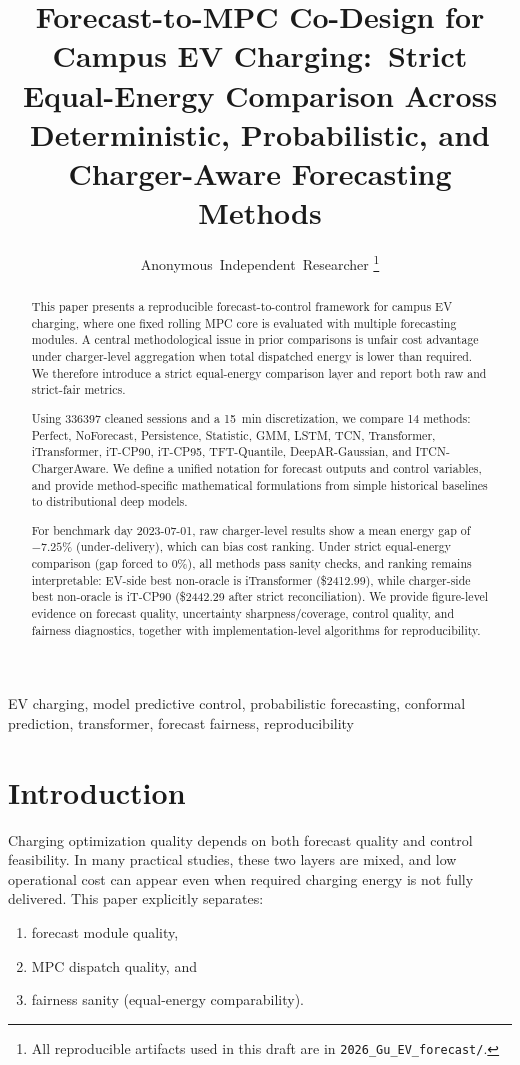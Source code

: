\documentclass[journal]{IEEEtran}
\title{Forecast-to-MPC Co-Design for Campus EV Charging:\
Strict Equal-Energy Comparison Across Deterministic, Probabilistic, and Charger-Aware Forecasting Methods}
\author{Anonymous~Independent~Researcher
\thanks{All reproducible artifacts used in this draft are in \texttt{2026\_Gu\_EV\_forecast/}.}}
\begin{document}
\maketitle

\begin{abstract}
This paper presents a reproducible forecast-to-control framework for campus EV charging, where one fixed rolling MPC core is evaluated with multiple forecasting modules. A central methodological issue in prior comparisons is unfair cost advantage under charger-level aggregation when total dispatched energy is lower than required. We therefore introduce a strict equal-energy comparison layer and report both raw and strict-fair metrics.

Using \num{336397} cleaned sessions and a \SI{15}{min} discretization, we compare 14 methods: Perfect, NoForecast, Persistence, Statistic, GMM, LSTM, TCN, Transformer, iTransformer, iT-CP90, iT-CP95, TFT-Quantile, DeepAR-Gaussian, and ITCN-ChargerAware. We define a unified notation for forecast outputs and control variables, and provide method-specific mathematical formulations from simple historical baselines to distributional deep models.

For benchmark day 2023-07-01, raw charger-level results show a mean energy gap of $-7.25\%$ (under-delivery), which can bias cost ranking. Under strict equal-energy comparison (gap forced to $0\%$), all methods pass sanity checks, and ranking remains interpretable: EV-side best non-oracle is iTransformer (\$2412.99), while charger-side best non-oracle is iT-CP90 (\$2442.29 after strict reconciliation). We provide figure-level evidence on forecast quality, uncertainty sharpness/coverage, control quality, and fairness diagnostics, together with implementation-level algorithms for reproducibility.
\end{abstract}

\begin{IEEEkeywords}
EV charging, model predictive control, probabilistic forecasting, conformal prediction, transformer, forecast fairness, reproducibility
\end{IEEEkeywords}

\section{Introduction}
Charging optimization quality depends on both forecast quality and control feasibility. In many practical studies, these two layers are mixed, and low operational cost can appear even when required charging energy is not fully delivered. This paper explicitly separates:
\begin{enumerate}
    \item forecast module quality,
    \item MPC dispatch quality, and
    \item fairness sanity (equal-energy comparability).
\end{enumerate}
\end{document}
